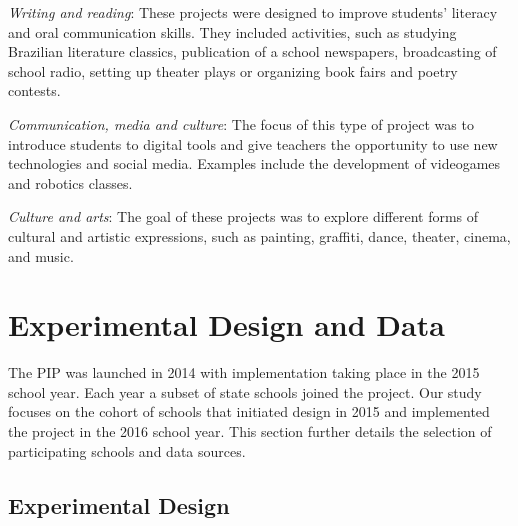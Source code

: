 \documentclass[11pt,a4paper]{article}
\begin{document}
\textit{Writing and reading}: These projects were designed to improve students’ literacy and oral communication skills. They included activities, such as studying Brazilian literature classics, publication of a school newspapers, broadcasting of school radio, setting up theater plays or organizing book fairs and poetry contests.
 
\textit{Communication, media and culture}: The focus of this type of project was to introduce students to digital tools and give teachers the opportunity to use new technologies and social media. Examples include the development of videogames and robotics classes.
 
\textit{Culture and arts}: The goal of these projects was to explore different forms of cultural and artistic expressions, such as painting, graffiti, dance, theater, cinema, and music. 



\section{Experimental Design and Data} \label{sec:design_data}

The PIP was launched in 2014 with implementation taking place in the 2015 school year. Each year a subset of state schools joined the project. Our study focuses on the cohort of schools that initiated design in 2015 and implemented the project in the 2016 school year. This section further details the selection of participating schools and data sources.

\subsection{Experimental Design} \label{sec:experiment}
\end{document}

